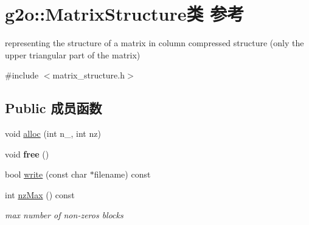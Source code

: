 \hypertarget{classg2o_1_1MatrixStructure}{\section{g2o\-:\-:Matrix\-Structure类 参考}
\label{classg2o_1_1MatrixStructure}
}


representing the structure of a matrix in column compressed structure (only the upper triangular part of the matrix)  




{\ttfamily \#include $<$matrix\-\_\-structure.\-h$>$}

\subsection*{Public 成员函数}
\begin{DoxyCompactItemize}
\item 
void \hyperlink{classg2o_1_1MatrixStructure_aeda2f4fd97499545773af331cd2c10f2}{alloc} (int n\-\_\-, int nz)
\item 
\hypertarget{classg2o_1_1MatrixStructure_a4bc9281fa8ae82dab908506fe0819498}{void {\bfseries free} ()}\label{classg2o_1_1MatrixStructure_a4bc9281fa8ae82dab908506fe0819498}

\item 
bool \hyperlink{classg2o_1_1MatrixStructure_ac8fbebec703b3a4255025445e640314e}{write} (const char $\ast$filename) const 
\item 
\hypertarget{classg2o_1_1MatrixStructure_a358efab55a4eee51f7dfaab21d7d9c11}{int \hyperlink{classg2o_1_1MatrixStructure_a358efab55a4eee51f7dfaab21d7d9c11}{nz\-Max} () const }\label{classg2o_1_1MatrixStructure_a358efab55a4eee51f7dfaab21d7d9c11}

\begin{DoxyCompactList}\small\item\em max number of non-\/zeros blocks \end{DoxyCompactList}\end{DoxyCompactItemize}

